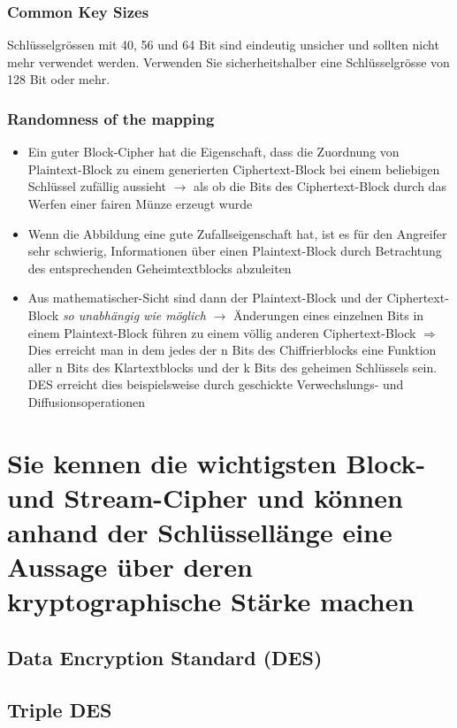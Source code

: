 \documentclass{report}
\theoremstyle{definition}
\theoremstyle{example}
\begin{document}
		\subsubsection{Common Key Sizes}
Schlüsselgrössen mit 40, 56 und 64 Bit sind eindeutig unsicher und sollten nicht mehr verwendet werden. Verwenden Sie sicherheitshalber eine Schlüsselgrösse von 128 Bit oder mehr.

		\subsubsection{Randomness of the mapping}
\begin{itemize}
	\item Ein guter Block-Cipher hat die Eigenschaft, dass die Zuordnung von Plaintext-Block zu einem generierten Ciphertext-Block bei einem beliebigen Schlüssel zufällig aussieht $\rightarrow$ als ob die Bits des Ciphertext-Block durch das Werfen einer fairen Münze erzeugt wurde
	\item Wenn die Abbildung eine gute Zufallseigenschaft hat, ist es für den Angreifer sehr schwierig, Informationen über einen Plaintext-Block durch Betrachtung des entsprechenden Geheimtextblocks abzuleiten
	\item Aus mathematischer-Sicht sind dann der Plaintext-Block und der Ciphertext-Block \textit{so unabhängig wie möglich} $\rightarrow$ Änderungen eines einzelnen Bits in einem Plaintext-Block führen zu einem völlig anderen Ciphertext-Block $\Rightarrow$ Dies erreicht man in dem jedes der n Bits des Chiffrierblocks eine Funktion aller n Bits des Klartextblocks und der k Bits des geheimen Schlüssels sein. DES erreicht dies beispielsweise durch geschickte Verwechslungs- und Diffusionsoperationen 
\end{itemize}

\section{Sie kennen die wichtigsten Block- und Stream-Cipher und können anhand der Schlüssellänge eine Aussage über deren kryptographische Stärke machen}

	\subsection{Data Encryption Standard (DES)}
	
	\subsection{Triple DES}
	
\end{document}
